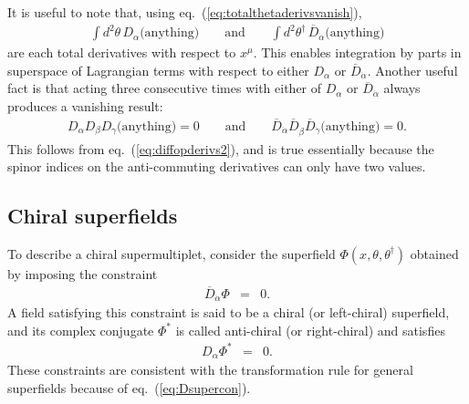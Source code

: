 \documentclass[12pt]{article}
\def\beq{\begin{eqnarray}}
\def\eeq{\end{eqnarray}}
\def\Dcon{\overline D}
\begin{document}
It is useful to note that, using eq.~(\ref{eq:totalthetaderivsvanish}), 
\beq
\int d^2\theta \,D_\alpha \mbox{(anything)} \qquad\mbox{and}\qquad
\int d^2\theta^\dagger \,\Dcon_{\dot\alpha} \mbox{(anything)}
\eeq
are each total derivatives with respect to $x^\mu$. This enables integration by parts 
in superspace
of Lagrangian terms with respect to either $D_\alpha$ or $\Dcon_{\dot\alpha}$. Another useful fact is that
acting three consecutive times with either of $D_\alpha$ or $\Dcon_{\dot\alpha}$ always produces a vanishing result:
\beq
D_\alpha D_\beta D_\gamma \mbox{(anything)} = 0 \qquad\mbox{and}\qquad
\Dcon_{\dot\alpha} \Dcon_{\dot\beta} \Dcon_{\dot\gamma} \mbox{(anything)} = 0.
\label{eq:DDDeq0}
\eeq
This follows from eq.~(\ref{eq:diffopderivs2}), and is true essentially 
because the spinor indices on the anti-commuting derivatives can only have two values.

\subsection{Chiral superfields\label{chiralsuperfields}}
\setcounter{equation}{0}
\setcounter{footnote}{2}

To describe a chiral supermultiplet, 
consider the superfield $\Phi(x,\theta,\theta^\dagger)$ 
obtained by imposing the constraint
\beq
\Dcon_{\dot \alpha} \Phi &=& 0.
\label{eq:leftchiralsuperfieldconstraint}
\eeq
A field satisfying this constraint is said to be a chiral (or 
left-chiral) superfield, and its complex conjugate $\Phi^*$ is called 
anti-chiral (or right-chiral) and satisfies
\beq
D_{\alpha} \Phi^* &=& 0.
\label{eq:anti-chiralsuperfieldconstraint}
\eeq
These constraints are 
consistent with the transformation rule for general superfields 
because of eq.~(\ref{eq:Dsupercon}).
\end{document}
